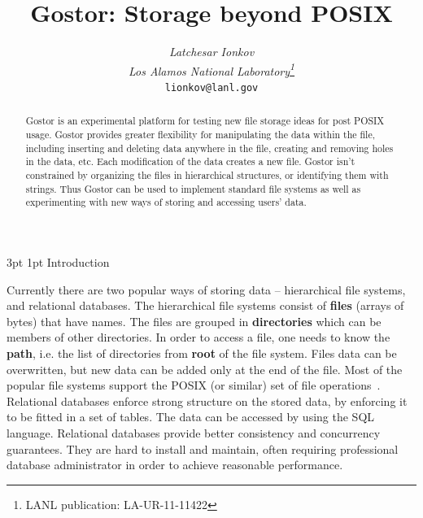 \documentclass[11pt]{p9article}
\makeatletter
\renewcommand\section{\@startsection {section}{1}{\z@} {3pt} {1pt} {\normalfont\normalsize\bfseries}}
\makeatother
\begin{document}
\title{\Large\textbf{Gostor: Storage beyond POSIX}}
\author{\large 
	\begin{tabular}{c}
	\textsl{Latchesar Ionkov}\\
	\textsl{Los Alamos National Laboratory\footnote{LANL publication: LA-UR-11-11422}}\\
	\texttt{lionkov@lanl.gov}\\\\
	\end{tabular}
}

\maketitle\thispagestyle{empty}
\pagestyle{empty}

\begin{abstract}

\setlength\parindent{0pt}
\setlength\parskip{0.25\baselineskip}
	Gostor is an experimental platform for testing new file
	storage ideas for post POSIX usage. Gostor provides greater
	flexibility for manipulating the data within the file,
	including inserting and deleting data anywhere in the file,
	creating and removing holes in the data, etc. Each
	modification of the data creates a new file. Gostor isn't constrained by 
	organizing the files in hierarchical structures, or identifying them with strings. Thus Gostor can be
	used to implement standard file systems as well as
	experimenting with new ways of storing and accessing users'
	data.
\end{abstract}


\section{Introduction}

Currently there are two popular ways of storing data -- hierarchical
file systems, and relational databases. The hierarchical file systems
consist of {\bfseries files} (arrays of bytes) that have names. The
files are grouped in {\bfseries directories} which can be members of
other directories. In order to access a file, one needs to know the
{\bfseries path}, i.e. the list of directories from {\bfseries root}
of the file system. Files data can be overwritten, but new data can be
added only at the end of the file. Most of the popular file systems
support the POSIX (or similar) set of file
operations~\cite{IEEE:POSIX.1-90}. Relational databases enforce strong
structure on the stored data, by enforcing it to be fitted in a set of
tables. The data can be accessed by using the SQL language. Relational
databases provide better consistency and concurrency guarantees. They
are hard to install and maintain, often requiring professional
database administrator in order to achieve reasonable performance.
\end{document}
